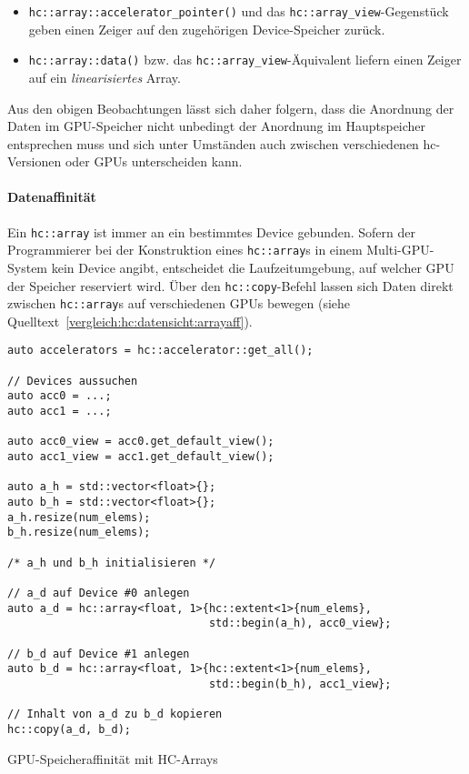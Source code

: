 \begin{itemize}
    \item \texttt{hc::array::accelerator\_pointer()} und das
          \texttt{hc::array\_view}-Gegenstück geben einen Zeiger auf den
          zugehörigen Device-Speicher zurück.
    \item \texttt{hc::array::data()} bzw. das
          \texttt{hc::array\_view}-Äquivalent liefern einen Zeiger auf ein
          \textit{linearisiertes} Array.
\end{itemize}

Aus den obigen Beobachtungen lässt sich daher folgern, dass die Anordnung der
Daten im GPU-Speicher nicht unbedingt der Anordnung im Hauptspeicher entsprechen
muss und sich unter Umständen auch zwischen verschiedenen \gls{hc}-Versionen
oder GPUs unterscheiden kann.

\paragraph{Datenaffinität}

Ein \texttt{hc::array} ist immer an ein bestimmtes Device gebunden. Sofern der
Programmierer bei der Konstruktion eines \texttt{hc::array}s in einem
Multi-GPU-System kein Device angibt, entscheidet die Laufzeitumgebung, auf
welcher GPU der Speicher reserviert wird. Über den \texttt{hc::copy}-Befehl
lassen sich Daten direkt zwischen \texttt{hc::array}s auf verschiedenen GPUs
bewegen (siehe Quelltext~\ref{vergleich:hc:datensicht:arrayaff}).

\begin{code}
    \begin{verbatim}
auto accelerators = hc::accelerator::get_all();

// Devices aussuchen
auto acc0 = ...;
auto acc1 = ...;

auto acc0_view = acc0.get_default_view();
auto acc1_view = acc1.get_default_view();
        
auto a_h = std::vector<float>{};
auto b_h = std::vector<float>{};
a_h.resize(num_elems);
b_h.resize(num_elems);

/* a_h und b_h initialisieren */

// a_d auf Device #0 anlegen
auto a_d = hc::array<float, 1>{hc::extent<1>{num_elems},
                               std::begin(a_h), acc0_view};

// b_d auf Device #1 anlegen
auto b_d = hc::array<float, 1>{hc::extent<1>{num_elems},
                               std::begin(b_h), acc1_view};

// Inhalt von a_d zu b_d kopieren
hc::copy(a_d, b_d);
    \end{verbatim}
    \caption{GPU-Speicheraffinität mit HC-Arrays}
    \label{vergleich:hc:datensicht:arrayaff}
\end{code}


